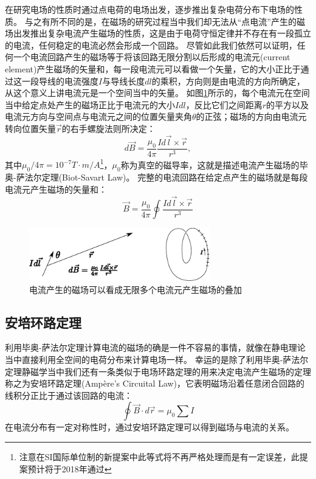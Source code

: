 在研究电场的性质时通过点电荷的电场出发，逐步推出复杂电荷分布下电场的性质。
与之有所不同的是，在磁场的研究过程当中我们却无法从“点电流”产生的磁场出发推出复杂电流产生磁场的性质，这是由于电荷守恒定律并不存在有一段孤立的电流，任何稳定的电流必然会形成一个回路。
尽管如此我们依然可以证明，任何一个电流回路产生的磁场等于将该回路无限分割以后形成的{\heiti 电流元}(current element)产生磁场的矢量和，每一段电流元可以看做一个矢量，它的大小正比于通过这一段导线的电流强度$I$与导线长度$dl$的乘积，方向则是由电流的方向所确定，从这个意义上讲电流元是一个空间当中的矢量。
如图\ref{fig: mag-biot-savart-law}所示的，每个电流元在空间当中给定点处产生的磁场正比于电流元的大小$Idl$，反比它们之间距离$r$的平方以及电流元方向与空间点与电流元之间的位置矢量夹角$\theta$的正弦；磁场的方向由电流元转向位置矢量$\vec{r}$的右手螺旋法则所决定：
\begin{equation}
d\vec{B} = \frac{\mu_0}{4\pi}\frac{Id\vec{l}\times \vec{r}}{r^3},
\end{equation}
其中$\mu_0/4\pi = 10^{-7}\unit{T \cdot m/A}$\footnote{注意在SI国际单位制的新提案中此等式将不再严格处理而是有一定误差，此提案预计将于2018年通过}，$\mu_0$称为真空的磁导率，这就是描述电流产生磁场的{\heiti 毕奥-萨法尔定理}(Biot-Savart Law)。
完整的电流回路在给定点产生的磁场就是每段电流元产生磁场的矢量和：
\begin{equation}
\vec{B} =\frac{\mu_0}{4\pi} \oint \frac{Id\vec{l}\times \vec{r}}{r^3}
\end{equation}
\begin{figure}[hbtp]
\centering
\includegraphics[width=0.7\textwidth]{images/biot-savart-law.pdf}
\caption{电流产生的磁场可以看成无限多个电流元产生磁场的叠加}\label{fig: mag-biot-savart-law}
\end{figure}


\subsection{安培环路定理}
利用毕奥-萨法尔定理计算电流的磁场的确是一件不容易的事情，就像在静电理论当中直接利用全空间的电荷分布来计算电场一样。
幸运的是除了利用毕奥-萨法尔定理静磁学当中我们还有一条类似于电场环路定理的用来决定电流产生磁场的定理称之为{\heiti 安培环路定理}(Amp\`ere's Circuital Law)，它表明磁场沿着任意闭合回路的线积分正比于通过该回路的电流：
\begin{equation}
\oint \vec{B}\cdot d\vec{r} = \mu_0\sum I
\end{equation}
在电流分布有一定对称性时，通过安培环路定理可以得到磁场与电流的关系。

